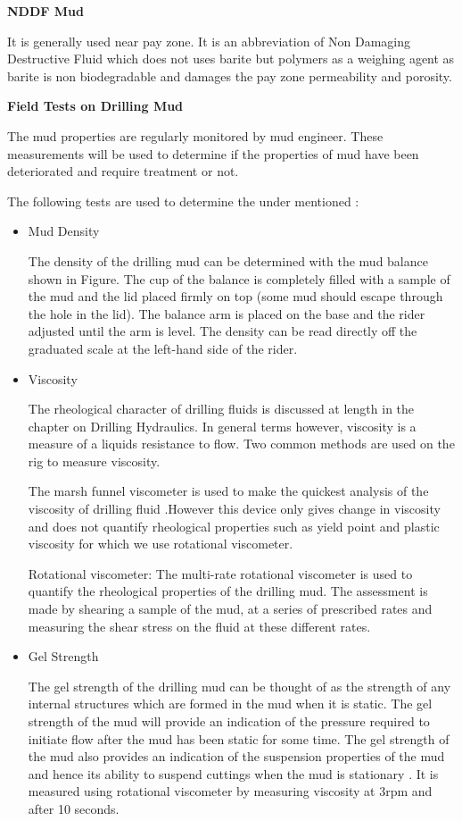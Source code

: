 \documentclass[11pt,a4paper]{article}
\begin{document}
\textbf{NDDF Mud}

It is generally used near pay zone. It is an abbreviation of Non Damaging Destructive Fluid which does not uses barite but polymers as a weighing agent as barite is non biodegradable and damages the pay zone permeability and porosity.

\textbf{Field Tests on Drilling Mud}

The mud properties are regularly monitored by mud engineer. These measurements will be used to determine if the properties of mud have been deteriorated and require treatment or not.

The following tests are used to determine the under mentioned :
\begin{itemize}

\item Mud Density

The density of the drilling mud can be determined with the mud balance shown in Figure. The cup of the balance is completely filled with a sample of the
mud and the lid placed firmly on top (some mud should escape through the hole in the lid). The balance arm is placed on the base and the rider adjusted until the arm is level. The density can be read directly off the graduated scale at the left-hand side of the rider.

\item Viscosity

The rheological character of drilling fluids is discussed at length in the chapter on Drilling Hydraulics. In general terms however, viscosity is a measure of a liquids resistance to flow. Two common methods are used on the rig to measure viscosity.

The marsh funnel viscometer is used to make the quickest analysis of the viscosity of drilling fluid .However this device only gives change in viscosity and does not quantify rheological properties such as yield point and plastic viscosity for which we use rotational viscometer.

Rotational viscometer: The multi-rate rotational viscometer is used
to quantify the rheological properties of the drilling mud. The
assessment is made by shearing a sample of the mud, at a series of
prescribed rates and measuring the shear stress on the fluid at these
different rates.


\item Gel Strength

The gel strength of the drilling mud can be thought of as the strength of any internal structures which are formed in the mud when it is static. The gel strength of the mud will provide an indication of the pressure required to initiate flow after the mud has been static for some time. The gel strength of the mud also provides an indication of the suspension properties of the mud and hence its ability to suspend cuttings when the mud is stationary . It is measured using rotational viscometer by measuring viscosity at 3rpm and after 10 seconds.


\end{itemize}
\end{document}
